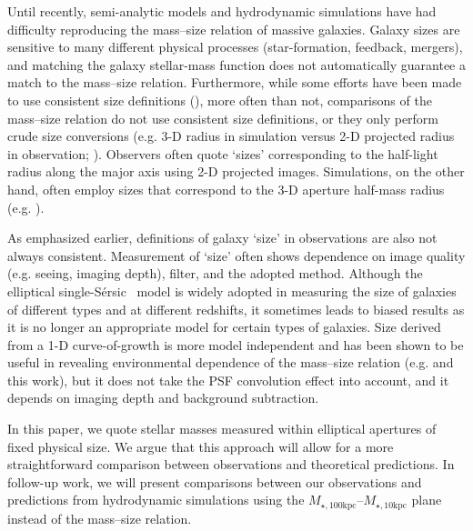 \documentclass[a4paper,fleqn,usenatbib]{mnras}
\def\ser{{S\'{e}rsic\ }}
\def\minn{{$M_{\star,10\mathrm{kpc}}$}}
\def\mtot{{$M_{\star,100\mathrm{kpc}}$}}
\begin{document}
    Until recently, semi-analytic models and hydrodynamic simulations have had
    difficulty reproducing the mass--size relation of massive galaxies. 
    Galaxy sizes are sensitive to many different physical processes (star-formation, 
    feedback, mergers), and matching the galaxy stellar-mass function does not 
    automatically guarantee a match to the mass--size relation. 
    Furthermore, while some efforts have been made to use consistent size definitions 
    (\citealt{McCarthy2017}), more often than not, comparisons of the mass--size relation 
    do not use consistent size definitions, or they only perform crude size conversions 
    (e.g. 3-D radius in simulation versus 2-D projected radius in observation; 
    \citealt{Genel2017}). 
    Observers often quote `sizes' corresponding to the half-light radius along the 
    major axis using 2-D projected images. 
    Simulations, on the other hand, often employ sizes that correspond to the 3-D 
    aperture half-mass radius (e.g. \citealt{Price2017}). 
    
    As emphasized earlier, definitions of galaxy `size' in observations are also not 
    always consistent. 
    Measurement of `size' often shows dependence on image quality (e.g. seeing, 
    imaging depth), filter, and the adopted method. 
    Although the elliptical single-\ser{} model is widely adopted in measuring the 
    size of galaxies of different types and at different redshifts, it sometimes leads
    to biased results as it is no longer an appropriate model for certain types of galaxies. 
    Size derived from a 1-D curve-of-growth is more model independent and has been 
    shown to be useful in revealing environmental dependence of the mass--size relation 
    (e.g. \citealt{Yoon2017} and this work), but it does not take the PSF convolution 
    effect into account, and it depends on imaging depth and background subtraction.

    In this paper, we quote stellar masses measured within elliptical apertures of 
    fixed physical size. 
    We argue that this approach will allow for a more straightforward comparison 
    between observations and theoretical predictions. 
    In follow-up work, we will present comparisons between our observations and 
    predictions from hydrodynamic simulations using the \mtot{}--\minn{} 
    plane instead of the mass--size relation. 
          
\end{document}
